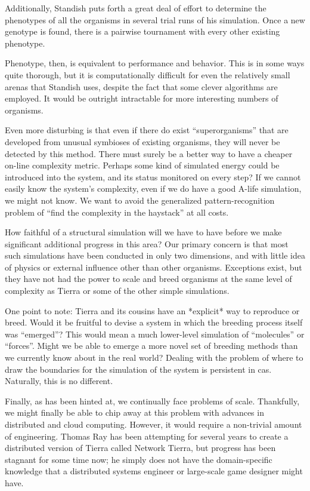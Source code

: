 \documentclass[11pt, twocolumn]{article}
\begin{document}
Additionally, Standish puts forth a great deal of effort to determine the phenotypes of all the organisms in several trial runs of his simulation. Once a new genotype is found, there is a pairwise tournament with every other existing phenotype.

Phenotype, then, is equivalent to performance and behavior. This is in some ways quite thorough, but it is computationally difficult for even the relatively small arenas that Standish uses, despite the fact that some clever algorithms are employed. It would be outright intractable for more interesting numbers of organisms.

Even more disturbing is that even if there do exist ``superorganisms'' that are developed from unusual symbioses of existing organisms, they will never be detected by this method. There must surely be a better way to have a cheaper on-line complexity metric. \cite{569719} Perhaps some kind of simulated energy could be introduced into the system, and its status monitored on every step? If we cannot easily know the system's complexity, even if we do have a good A-life simulation, we might not know. We want to avoid the generalized pattern-recognition problem of ``find the complexity in the haystack'' at all costs.

How faithful of a structural simulation will we have to have before we make significant additional progress in this area? Our primary concern is that most such simulations have been conducted in only two dimensions, and with little idea of physics or external influence other than other organisms. Exceptions exist, but they have not had the power to scale and breed organisms at the same level of complexity as Tierra or some of the other simple simulations.

One point to note: Tierra and its cousins have an *explicit* way to reproduce or breed. Would it be fruitful to devise a system in which the breeding process itself was ``emerged''? This would mean a much lower-level simulation of ``molecules'' or ``forces''. Might we be able to emerge a more novel set of breeding methods than we currently know about in the real world? Dealing with the problem of where to draw the boundaries for the simulation of the system is persistent in cas. Naturally, this is no different.

Finally, as has been hinted at, we continually face problems of scale. Thankfully, we might finally be able to chip away at this problem with advances in distributed and cloud computing. However, it would require a non-trivial amount of engineering. Thomas Ray has been attempting for several years to create a distributed version of Tierra called Network Tierra, but progress has been stagnant for some time now; he simply does not have the domain-specific knowledge that a distributed systems engineer or large-scale game designer might have.
\end{document}
